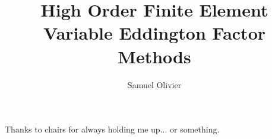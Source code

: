 \documentclass{dissertation}
\begin{document}
\title{High Order Finite Element Variable Eddington Factor Methods}
\author{Samuel Olivier}
\maketitle

\copyrightpage

\begin{abstract}

\end{abstract}

\begin{frontmatter}

\begin{KeepFromToc}
\tableofcontents
\end{KeepFromToc}
\clearpage
\listoffigures
\clearpage
\listoftables
\clearpage

\begin{acknowledgements}
Thanks to chairs for always holding me up... or something. 
\end{acknowledgements}
\end{frontmatter}

\pagestyle{headings}



\clearpage
\printbibliography
\end{document}
